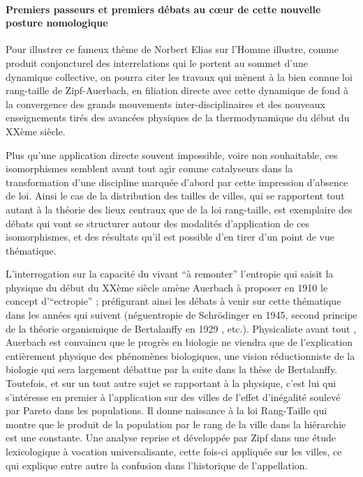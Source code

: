 \paragraph{Premiers passeurs et premiers débats au cœur de cette nouvelle posture nomologique}
\label{p:passeur_systemique}

Pour illustrer ce fameux thème de Norbert Elias \autocite[31-33]{Delmotte2010} \textcite{Elias1991} sur l'Homme illustre, comme produit conjoncturel des interrelations qui le portent au sommet d'une dynamique collective, on pourra citer les travaux qui mènent à la bien connue loi rang-taille de Zipf-Auerbach, en filiation directe avec cette dynamique de fond à la convergence des grands mouvements inter-disciplinaires et des nouveaux enseignements tirés des avancées physiques de la thermodynamique du début du XXème siècle.

Plus qu'une application directe souvent impossible, voire non souhaitable, ces isomorphismes semblent avant tout agir comme catalyseurs dans la transformation d'une discipline marquée d'abord par cette impression d'absence de loi. Ainsi le cas de la distribution des tailles de villes, qui se rapportent tout autant à la théorie des lieux centraux que de la loi rang-taille, est exemplaire des débats qui vont se structurer autour des modalités d'application de ces isomorphismes, et des résultats qu'il est possible d'en tirer d'un point de vue thématique.

L'interrogation sur la capacité du vivant \enquote{à remonter} l'entropie qui saisit la physique du début du XXème siècle amène Auerbach à proposer en 1910 le concept d'\enquote{ectropie} \autocite[81]{Pouvreau2013}; préfigurant ainsi les débats à venir sur cette thématique dans les années qui suivent (néguentropie de Schrödinger en 1945, second principe de la théorie organismique de Bertalanffy en 1929 \autocite[475]{Pouvreau2013}, etc.)\autocite[80]{Pouvreau2013}. Physicaliste avant tout \autocite[87]{Pouvreau2013}, Auerbach est convaincu que le progrès en biologie ne viendra que de l'explication entièrement physique des phénomènes biologiques, une vision réductionniste de la biologie qui sera largement débattue par la suite dans la thèse de Bertalanffy. Toutefois, et sur un tout autre sujet se rapportant à la physique, c'est lui qui s’intéresse en premier à l'application sur des villes de l'effet d'inégalité soulevé par Pareto dans les populations.\autocite{Auerbach1913} Il donne naissance à la loi Rang-Taille qui montre que le produit de la population par le rang de la ville dans la hiérarchie est une constante. Une analyse reprise et développée par Zipf dans une étude lexicologique à vocation universalisante, cette fois-ci appliquée sur les villes, ce qui explique entre autre la confusion dans l’historique de l’appellation.

